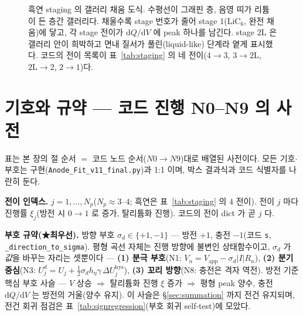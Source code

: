 \documentclass[11pt,a4paper]{article}
\newcommand{\dd}{\mathrm{d}}
\newcommand{\app}{\mathrm{app}}
\newcommand{\hys}{\mathrm{hys}}
\newcommand{\code}[1]{\texttt{#1}}
\begin{document}
\begin{figure}[t]
\caption{흑연 staging 의 갤러리 채움 도식. 수평선이 그래핀 층, 음영 띠가 리튬이 든 층간
갤러리다. 채울수록 stage 번호가 줄어 stage 1($\mathrm{LiC_6}$, 완전 채움)에 닿고, 각 stage 전이가
$\dd Q/\dd V$ 에 peak 하나를 남긴다. stage $2\mathrm L$ 은 갤러리 안이 희박하고 면내 질서가 풀린(liquid-like)
단계라 옅게 표시했다. 코드의 전이 목록이 표~\ref{tab:staging} 의 네 전이($4\!\to\!3$, $3\!\to\!2\mathrm L$, $2\mathrm L\!\to\!2$, $2\!\to\!1$)다.}
\label{fig:staging}
\end{figure}

\tableofcontents
\newpage

\section{기호와 규약 — 코드 진행 N0--N9 의 사전}\label{sec:notation}
표는 본 장의 절 순서 $=$ 코드 노드 순서($N0\!\to\!N9$)대로 배열된 사전이다. 모든 기호$\cdot$부호는 구현(\code{Anode\_Fit\_v11\_final.py})과 1:1 이며, 박스 결과식과 코드 식별자를 나란히 둔다.

\textbf{전이 인덱스.} $j=1,\dots,N_p$($N_p\approx3$--$4$; 흑연은 표~\ref{tab:staging} 의 $4$ 전이). 전이 $j$ 마다 진행률 $\xi_j$(방전 시 $0\to1$ 로 증가, 탈리튬화 진행). 코드의 전이 dict 가 곧 $j$ 다.

\textbf{부호 규약(★최우선).} 방향 부호 $\sigma_d\in\{+1,-1\}$ — 방전 $+1$, 충전 $-1$(코드 \code{s}, \code{\_direction\_to\_sigma}). 평형 곡선 자체는 진행 방향에 불변인 상태함수이고, $\sigma_d$ 가 \emph{값}을 바꾸는 자리는 셋뿐이다 — \textbf{(1) 분극 부호}(N1: $V_n=V_\app-\sigma_d|I|R_n$), \textbf{(2) 분기 중심}(N3: $U_j^d=U_j+\tfrac12\sigma_d h_\eta\gamma\,\Delta U_j^\hys$), \textbf{(3) 꼬리 방향}(N8: 충전은 격자 역전). 방전 기준 핵심 부호 사슬 — $V$ 상승 $\Rightarrow$ 탈리튬화 진행 $\xi$ 증가 $\Rightarrow$ 평형 peak 양수, 충전 $\dd Q/\dd V$ 는 방전의 거울(양수 유지). 이 사슬은 §\ref{sec:summation} 까지 전건 유지되며, 전건 회귀 점검은 표~\ref{tab:signregression}(부호 회귀 self-test)에 모았다.
\end{document}
